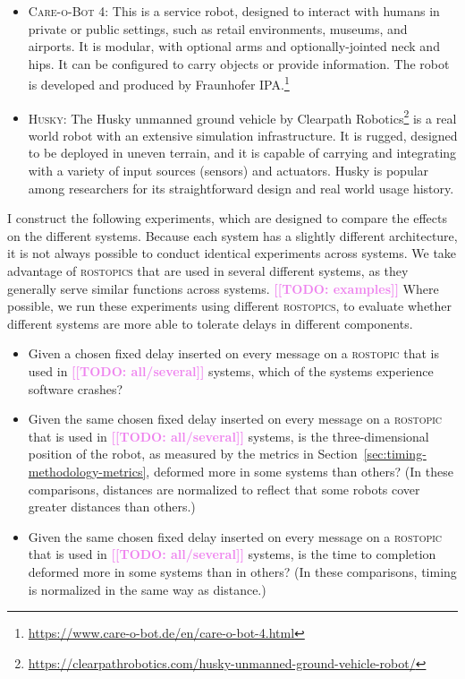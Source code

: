 \documentclass[conference]{IEEEtran}
\newcommand{\todo}[1]{\textcolor{violet}{{\bfseries [[TODO: #1]]}}}
\newcommand{\tool}[1]{\textsc{#1}}
\begin{document}
\begin{itemize}
\item{\tool{Care-o-Bot 4}:} This is a service robot, designed to interact with humans in private or public settings, such as retail environments, museums, and airports. It is modular, with optional arms and optionally-jointed neck and hips. It can be configured to carry objects or provide information. The robot is developed and produced by Fraunhofer IPA.\footnote{\url{https://www.care-o-bot.de/en/care-o-bot-4.html}}


\item{\tool{Husky}:} The Husky unmanned ground vehicle by Clearpath Robotics\footnote{\url{https://clearpathrobotics.com/husky-unmanned-ground-vehicle-robot/}} is a real world robot with an extensive simulation infrastructure. It is rugged, designed to be deployed in uneven terrain, and it is capable of carrying and integrating with a variety of input sources (sensors) and actuators. Husky is popular among researchers for its straightforward design and real world usage history.

\end{itemize}

I construct the following experiments, which are designed to compare the effects on the different systems.
Because each system has a slightly different architecture, it is not always possible to
conduct identical experiments across systems.
We take advantage of \tool{rostopics} that are used in several different systems,
as they generally serve similar functions across systems.
\todo{examples}
Where possible, we run these experiments using different \tool{rostopics}, to
evaluate whether different systems are more able to tolerate delays in different
components.

\begin{itemize}
\item Given a chosen fixed delay inserted on every message on a \tool{rostopic} that is used in \todo{all/several} systems, which of the systems experience software crashes?
\item Given the same chosen fixed delay inserted on every message on a \tool{rostopic} that
is used in \todo{all/several} systems, is the three-dimensional position of the
robot, as measured by the metrics in Section~\ref{sec:timing-methodology-metrics},
deformed more in some systems than others? (In these comparisons, distances are
normalized to reflect that some robots cover greater distances than others.)
\item Given the same chosen fixed delay inserted on every message on a \tool{rostopic} that
is used in \todo{all/several} systems, is the time to completion deformed more in
some systems than in others? (In these comparisons, timing is normalized in the same way as distance.)
\end{itemize}
\end{document}
